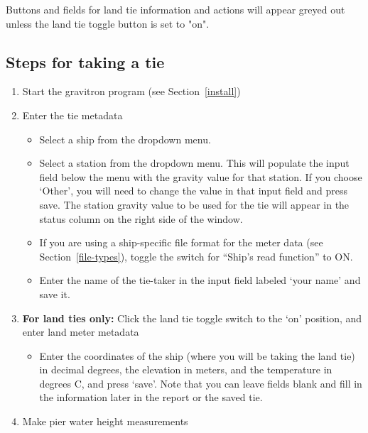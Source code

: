 \documentclass{pfpe-manual}
\begin{document}
\noindent
Buttons and fields for land tie information and actions will appear greyed out unless the land tie toggle button is set to "on".

\subsection{Steps for taking a tie}
\label{tie-instructions}
\begin{enumerate}
\item Start the gravitron program (see Section~\ref{install})
\item Enter the tie metadata
    \begin{itemize}
    \item Select a ship from the dropdown menu.
    \item Select a station from the dropdown menu. This will populate the input field below the menu with the gravity value for that station. If you choose `Other', you will need to change the value in that input field and press save. The station gravity value to be used for the tie will appear in the status column on the right side of the window.
    \item If you are using a ship-specific file format for the meter data (see Section~\ref{file-types}), toggle the switch for ``Ship's read function'' to ON.
    \item Enter the name of the tie-taker in the input field labeled `your name' and save it.
    \end{itemize}
\item \textbf{For land ties only:} Click the land tie toggle switch to the `on' position, and enter land meter metadata
    \begin{itemize}
    \item Enter the coordinates of the ship (where you will be taking the land tie) in decimal degrees, the elevation in meters, and the temperature in degrees C, and press `save'. Note that you can leave fields blank and fill in the information later in the report or the saved tie.
    \end{itemize}
\item Make pier water height measurements

\end{enumerate}
\end{document}

